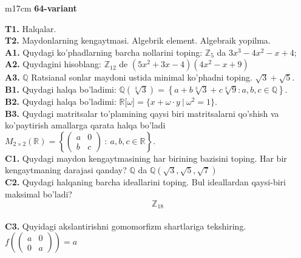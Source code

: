 \documentclass{article}
\begin{document}
\begin{tabular}{m{17cm}}
\textbf{64-variant}
\newline

\textbf{T1.} Halqalar. \\
\textbf{T2.} Maydonlarning kengaytmasi. Algebrik element. Algebraik yopilma. \\
\textbf{A1.} Quydagi ko'phadlarning barcha nollarini toping:
\(\mathbb{Z}_{5}\) da \(3x^{3} - 4x^{2} - x + 4\); \\
\textbf{A2.} Quydagini hisoblang:
\(\mathbb{Z}_{12}\) de \(\left( 5x^{2} + 3x - 4 \right)\left( 4x^{2} - x + 9 \right)\) \\
\textbf{A3.} \(\mathbb{Q}\) Ratsianal sonlar maydoni ustida minimal ko'phadni toping.
\(\sqrt{3} + \sqrt{5}\). \\
\textbf{B1.} Quydagi halqa bo'ladimi:
\(\mathbb{Q}\left( \sqrt[3]{3} \right) = \left\{ a + b\sqrt[3]{3} + c\sqrt[3]{9}:a,b,c \in \mathbb{Q} \right\}\). \\
\textbf{B2.} Quydagi halqa bo'ladimi:
\(\mathbb{R\lbrack}\omega\rbrack = \{ x + \omega \cdot y\ |\ \omega^{2} = 1\}\). \\
\textbf{B3.} Quydagi matritsalar to'plamining qaysi biri matritsalarni qo'shish va ko'paytirish amallarga qarata halqa bo'ladi
\(M_{2 \times 2}\mathbb{(R) =}\left\{ \begin{pmatrix}
a & 0 \\
b & c
\end{pmatrix}\ :\ a,b,c \in \mathbb{R} \right\}\). \\
\textbf{C1.} Quydagi maydon kengaytmasining har birining bazisini toping. Har bir kengaytmaning darajasi qanday?
\(\mathbb{Q}\) da \(\mathbb{Q}\left( \sqrt{3},\sqrt{5},\sqrt{7} \right)\) \\
\textbf{C2.} Quydagi halqaning barcha ideallarini toping. Bul ideallardan qaysi-biri maksimal bo'ladi?
\[\mathbb{Z}_{18}\] \\
\textbf{C3.} Quyidagi akslantirishni gomomorfizm shartlariga tekshiring. \(f\left( \begin{pmatrix}
a & 0 \\
0 & a
\end{pmatrix} \right) = a\) \\

\end{tabular}
\vspace{1cm}
\end{document}
